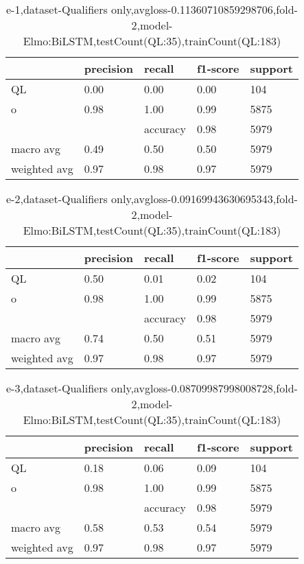 \begin{table}[!ht] 
\centering
\caption{e-1,dataset-Qualifiers only,avgloss-0.11360710859298706,fold-2,model-Elmo:BiLSTM,testCount(QL:35),trainCount(QL:183)}\label{e-1data-qualS.tsv}
\begin{tabularx}{300pt}{|X|X|X|X|X|}
\hline
&precision&recall&f1-score&support\\
\hline
QL&0.00&0.00&0.00&104\\
\hline
o&0.98&1.00&0.99&5875\\
\hline
&&accuracy&0.98&5979\\
\hline
macro avg&0.49&0.50&0.50&5979\\
\hline
weighted avg&0.97&0.98&0.97&5979\\
\hline
\end{tabularx}
\end{table}
\begin{table}[!ht] 
\centering
\caption{e-2,dataset-Qualifiers only,avgloss-0.09169943630695343,fold-2,model-Elmo:BiLSTM,testCount(QL:35),trainCount(QL:183)}\label{e-2data-qualS.tsv}
\begin{tabularx}{300pt}{|X|X|X|X|X|}
\hline
&precision&recall&f1-score&support\\
\hline
QL&0.50&0.01&0.02&104\\
\hline
o&0.98&1.00&0.99&5875\\
\hline
&&accuracy&0.98&5979\\
\hline
macro avg&0.74&0.50&0.51&5979\\
\hline
weighted avg&0.97&0.98&0.97&5979\\
\hline
\end{tabularx}
\end{table}
\begin{table}[!ht] 
\centering
\caption{e-3,dataset-Qualifiers only,avgloss-0.08709987998008728,fold-2,model-Elmo:BiLSTM,testCount(QL:35),trainCount(QL:183)}\label{e-3data-qualS.tsv}
\begin{tabularx}{300pt}{|X|X|X|X|X|}
\hline
&precision&recall&f1-score&support\\
\hline
QL&0.18&0.06&0.09&104\\
\hline
o&0.98&1.00&0.99&5875\\
\hline
&&accuracy&0.98&5979\\
\hline
macro avg&0.58&0.53&0.54&5979\\
\hline
weighted avg&0.97&0.98&0.97&5979\\
\hline
\end{tabularx}
\end{table}
